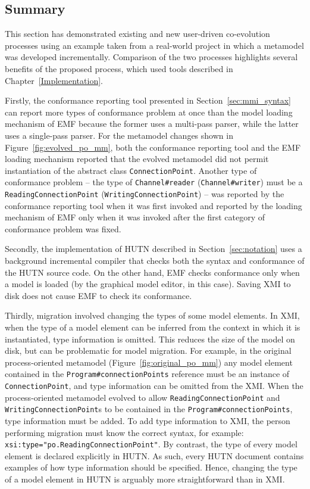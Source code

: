 \subsection{Summary}
\label{subsec:user_driven_example_summary}
This section has demonstrated existing and new user-driven co-evolution processes using an example taken from a real-world project in which a metamodel was developed incrementally. Comparison of the two processes highlights several benefits of the proposed process, which used tools described in Chapter~\ref{Implementation}.

Firstly, the conformance reporting tool presented in Section~\ref{sec:mmi_syntax} can report more types of conformance problem at once than the model loading mechanism of EMF because the former uses a multi-pass parser, while the latter uses a single-pass parser. For the metamodel changes shown in Figure~\ref{fig:evolved_po_mm}, both the conformance reporting tool and the EMF loading mechanism reported that the evolved metamodel did not permit instantiation of the abstract class \texttt{Co\-nn\-ec\-ti\-o\-nPo\-i\-nt}. Another type of conformance problem -- the type of \texttt{Ch\-an\-n\-el\#re\-ad\-er} (\texttt{Ch\-an\-n\-el\#wr\-it\-er}) must be a \texttt{Re\-ad\-i\-ngCo\-nn\-ec\-ti\-o\-nPo\-i\-nt} (\texttt{Wr\-i\-ti\-ngCo\-nn\-ec\-ti\-o\-nPo\-i\-nt}) -- was reported by the conformance reporting tool when it was first invoked and reported by the loading mechanism of EMF only when it was invoked after the first category of conformance problem was fixed.

Secondly, the implementation of HUTN described in Section~\ref{sec:notation} uses a background incremental compiler that checks both the syntax and conformance of the HUTN source code. On the other hand, EMF checks conformance only when a model is loaded (by the graphical model editor, in this case). Saving XMI to disk does not cause EMF to check its conformance.

Thirdly, migration involved changing the types of some model elements. In XMI, when the type of a model element can be inferred from the context in which it is instantiated, type information is omitted. This reduces the size of the model on disk, but can be problematic for model migration. For example, in the original process-oriented metamodel (Figure~\ref{fig:original_po_mm}) any model element contained in the \texttt{Pr\-og\-r\-am\#co\-nn\-ec\-ti\-onPo\-in\-ts} reference must be an instance of \texttt{Co\-nn\-ec\-ti\-onPo\-in\-t}, and type information can be omitted from the XMI. When the process-oriented metamodel evolved to allow \texttt{Re\-ad\-i\-ngCo\-nn\-ec\-ti\-o\-nPo\-i\-nt} and \texttt{Wr\-i\-ti\-ngCo\-nn\-ec\-ti\-o\-nPo\-i\-nt}s to be contained in the \texttt{Pr\-og\-r\-am\#co\-nn\-ec\-ti\-onPo\-in\-ts}, type information must be added. To add type information to XMI, the person performing migration must know the correct syntax, for example: \texttt{xsi:type="po.Re\-ad\-i\-ngCo\-nn\-ec\-ti\-onPo\-i\-nt"}. By contrast, the type of every model element is declared explicitly in HUTN. As such, every HUTN document contains examples of how type information should be specified. Hence, changing the type of a model element in HUTN is arguably more straightforward than in XMI.

